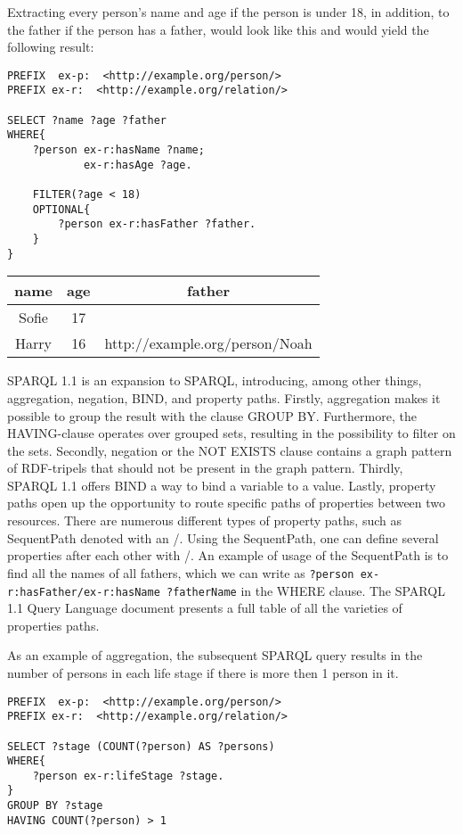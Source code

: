 \para
Extracting every person's name and age if the person is under 18, in addition, to the father if the person has a father, would look like this and would yield   the following result:

\para
\begin{lstlisting}[frame=single, language=turtle, frame=none]
PREFIX  ex-p:  <http://example.org/person/> 
PREFIX ex-r:  <http://example.org/relation/> 

SELECT ?name ?age ?father
WHERE{
    ?person ex-r:hasName ?name;
            ex-r:hasAge ?age.

    FILTER(?age < 18)
    OPTIONAL{
        ?person ex-r:hasFather ?father.
    }
}
\end{lstlisting}

\para
\begin{tabular}{@{}ccc@{}}
    \toprule
    name & age & father \\ \midrule
    Sofie & 17 & \\ 
    Harry & 16 & http://example.org/person/Noah\\ \bottomrule
\end{tabular}


\para
SPARQL 1.1\cite{SPARQL1.1} is an expansion to SPARQL, introducing, among other things, aggregation, negation, BIND, and property paths. Firstly, aggregation makes it possible to group the result with the clause GROUP BY. Furthermore, the HAVING-clause operates over grouped sets, resulting in the possibility to filter on the sets. Secondly, negation or the NOT EXISTS clause contains a graph pattern of RDF-tripels that should not be present in the graph pattern. Thirdly, SPARQL 1.1 offers BIND a way to bind a variable to a value. Lastly, property paths open up the opportunity to route specific paths of properties between two resources. There are numerous different types of property paths, such as SequentPath denoted with an /. Using the SequentPath, one can define several properties after each other with /. An example of usage of the SequentPath is to find all the names of all fathers, which we can write as \lstinline{?person ex-r:hasFather/ex-r:hasName ?fatherName} in the WHERE clause. The SPARQL 1.1 Query Language document presents a full table of all the varieties of properties paths.

\para
As an example of aggregation, the subsequent SPARQL query results in the number of persons in each life stage if there is more then 1 person in it. 

\begin{lstlisting}[frame=single, language=turtle, frame=none]
PREFIX  ex-p:  <http://example.org/person/> 
PREFIX ex-r:  <http://example.org/relation/> 

SELECT ?stage (COUNT(?person) AS ?persons)
WHERE{
    ?person ex-r:lifeStage ?stage.
}
GROUP BY ?stage
HAVING COUNT(?person) > 1
\end{lstlisting}
    
